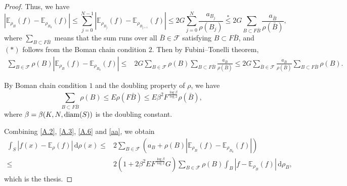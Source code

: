 \documentclass[a4paper,11pt]{article}
\numberwithin{equation}{section}
\theoremstyle{plain}
\theoremstyle{definition}
\theoremstyle{remark}
\newcommand{\E}{\mathbb{E}}
\newcommand{\diam}{\mathop{\rm diam}\nolimits}
\renewcommand{\d}{{\mathrm d}}
\begin{document}
\begin{appendices}
\begin{proof}
    	 Thus, we have
    	 \begin{equation}
    	 |\E_{\rho_{B}}(f)-\E_{\rho_{B_0}}(f)|\leq \sum_{j=0}^{N-1}|\E_{\rho_{B_j}}(f)-\E_{\rho_{B_{j+1}}}(f)|\leq 2G \sum_{j=0}^{N}\frac{a_{B_j}}{\rho(B_j)}\overset{*}{\leq} 2G \sum_{B\subset F \bar{B}}\frac{a_{\bar{B}}}{\rho(\bar{B})},
    	 \end{equation}
    	 where $ \sum_{B\subset F \bar{B}}$ means that the sum runs over all  $\bar{B}\in\mathcal{F}$ satisfying $B\subset F \bar{B}$, and $(*)$ follows from the Boman chain condition $2$.
    	 Then by Fubini--Tonelli theorem,  
    	 \begin{equation}\label{A.6}
    	 	\begin{aligned}
    	 	 	  \sum_{B \in \mathcal{F}} \rho(B) |\E_{\rho_{B}}(f)-\E_{\rho_{B_0}}(f)|
    	 	 	  \leq & 2G\sum_{B \in \mathcal{F}} \rho(B) \sum_{B\subset F \bar{B}}\frac{a_{\bar{B}}}{\rho(\bar{B})}
    	 	 	  \leq 2G\sum_{\bar{B} \in \mathcal{F}} \frac{a_{\bar{B}}}{\rho(\bar{B})}\sum_{B\subset F \bar{B}}\rho(B).
    	 	\end{aligned}
    	 \end{equation}
    	 
By Boman chain condition $1$ and  the doubling property of $\rho$, we have  
    	 \begin{equation}\label{aa}
       \sum_{B\subset F \bar{B}}\rho(B)\leq E\rho(F\bar{B})\leq E\beta^2F^\frac{\log \beta}{\log 2}\rho(\bar{B}),
    	 \end{equation}
where  $\beta=\beta(K,N,\diam(S))$ is the doubling constant.
    	 
    	 Combining \eqref{A.2}, \eqref{A.3},  \eqref{A.6} and \eqref{aa}, we obtain
    	 \begin{equation}\label{A_A}
    	 	\begin{aligned}
    	 		 \int_S |f(x)-\E_{\rho}(f)|\,\d\rho(x)\leq & 2 \sum_{B \in \mathcal{F}} \left(a_B+\rho(B) |\E_{\rho_{B}}(f)-\E_{\rho_{B_0}}(f)|\right)\\
    	 		 \leq &2(1+2\beta^2 EF^\frac{\log \beta}{\log 2}G) \sum_{B \in \mathcal{F}} \rho(B)\int_B |f-\E_{\rho_{B}}(f)|\,\d\rho_B,
    	 	\end{aligned}
    	 \end{equation}
  which is the thesis.
    \end{proof}
	
	
	\end{appendices}
	
\end{document}
